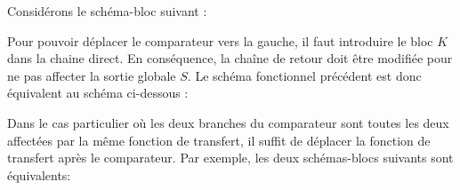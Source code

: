 Considérons le schéma-bloc suivant :
\begin{center}
\end{center}

Pour pouvoir déplacer le comparateur vers la gauche, 
il faut introduire le bloc $K$ dans la chaine direct.
En conséquence, la chaîne de retour doit être modifiée pour ne pas affecter la sortie globale $S$.
Le schéma fonctionnel précédent est donc équivalent au schéma ci-dessous :

\begin{center}
\end{center}


Dans le cas particulier où les deux branches du comparateur sont toutes les deux affectées par la même 
fonction de transfert, il suffit de déplacer la fonction de transfert après le comparateur. 
Par exemple, les deux schémas-blocs suivants sont équivalents: 

